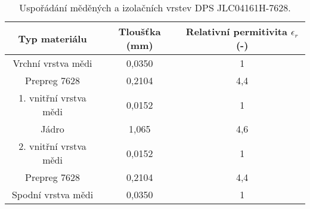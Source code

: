 \begin{table}[ht]
\caption{Uspořádání měděných a izolačních vrstev DPS JLC04161H-7628.} 
\centering

\begin{tabular}{|c|c|c|}
\hline 
Typ materiálu & Tloušťka (mm) & Relativní permitivita $ \epsilon_{r} $(-) \\ 
\hline 
\hline 
Vrchní vrstva mědi & 0,0350 & 1 \\ 
\hline 
Prepreg 7628 & 0,2104 & 4,4 \\ 
\hline 
1. vnitřní vrstva mědi & 0,0152 & 1 \\ 
\hline 
Jádro & 1,065 & 4,6 \\ 
\hline 
2. vnitřní vrstva mědi & 0,0152 & 1 \\ 
\hline 
Prepreg 7628 & 0,2104 & 4,4 \\ 
\hline 
Spodní vrstva mědi & 0,0350 & 1 \\ 
\hline 
\end{tabular} 


\label{table:materialStackup}
\end{table} 
